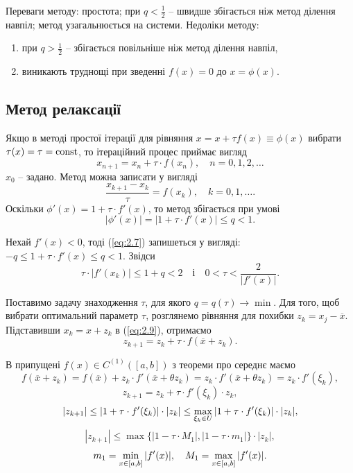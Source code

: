 Переваги методу: простота; при $q < \frac12$ -- швидше збігається ніж метод ділення навпіл; метод узагальнюється на системи. Недоліки методу: 
\begin{enumerate}
	\item при $q > \frac12$ -- збігається повільніше ніж метод ділення навпіл,
	\item виникають труднощі при зведенні $f (x) = 0$ до $x =\phi (x)$.
\end{enumerate}


\subsection{Метод релаксації}

Якщо в методі простої ітерації для рівняння $x = x +\tau f (x) \equiv\phi (x)$ вибрати $\tau (x) =\tau = \operatorname{const}$, то ітераційний процес приймає вигляд
\begin{equation}
	\label{eq:2.9}
	x_{n+1} = x_n +\tau \cdot f(x_n), \quad n = 0,1,2,\ldots
\end{equation}
$x_0$ -- задано. Метод можна записати у вигляді \[\dfrac{x_{k+1}-x_k}{\tau} = f(x_k), \quad k=0,1,\ldots.\] Оскільки $\phi'(x) =1+\tau\cdot f'(x)$, то метод збігається при умові \[ |\phi'(x)| = |1+\tau \cdot f'(x)| \le q < 1.\]

Нехай $f'(x) < 0$, тоді (\ref{eq:2.7}) запишеться у вигляді: $-q \le 1 +\tau \cdot f'(x) \le q < 1$. Звідси \[\tau \cdot |f'(x_k)| \le 1 + q < 2 \quad \text{і} \quad 0 < \tau < \dfrac{2}{|f'(x)|}. \]

Поставимо задачу знаходження $\tau$, для якого $q = q(\tau) \to \min$. Для того, щоб вибрати оптимальний параметр $\tau$, розглянемо рівняння для похибки $z_k = x_j - \overline{x}$. \\

Підставивши $x_k = x + z_k$ в (\ref{eq:2.9}), отримаємо
\[ z_{k+1} = z_k + \tau \cdot f(\overline{x} + z_k).\]

В припущені $f(x)\in C^{(1)}([a,b])$ з теореми про середнє маємо
\[ f(\overline{x} + z_k) = f(\overline{x}) + z_k \cdot f'(\overline{x} + \theta z_k) = z_k \cdot f'(\overline{x}+\theta z_k) = z_k \cdot f'(\xi_k), \]
\[ z_{k+1} = z_k + \tau \cdot f'(\xi_k) \cdot z_k, \]
\[ |z_{k+1}| \le |1 + \tau \cdot f'(\xi_k)| \cdot |z_k| \le \displaystyle\max\limits_{\xi_k \in U} |1 + \tau \cdot f'(\xi_k)| \cdot |z_k|, \]
\[ |z_{k+1}| \le \max \{|1-\tau \cdot M_1|, |1-\tau \cdot m_1| \}\cdot |z_k|, \]
\[ m_1 = \displaystyle\min\limits_{x\in[a,b]} |f'(x)|, \quad M_1 = \displaystyle\max\limits_{x\in[a,b]} |f'(x)|. \]

